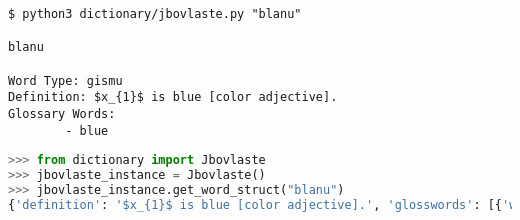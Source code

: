 \begin{lstlisting}[caption=Jbovlaste module being used as a command-line interface tool]
$ python3 dictionary/jbovlaste.py "blanu"

blanu

Word Type: gismu
Definition: $x_{1}$ is blue [color adjective].
Glossary Words:
        - blue
\end{lstlisting}

\begin{lstlisting}[language=Python, caption=Jbovlaste class being used by a Python script]
>>> from dictionary import Jbovlaste
>>> jbovlaste_instance = Jbovlaste()
>>> jbovlaste_instance.get_word_struct("blanu")
{'definition': '$x_{1}$ is blue [color adjective].', 'glosswords': [{'word': 'blue', 'sense': None}], 'type': 'gismu'}
\end{lstlisting}